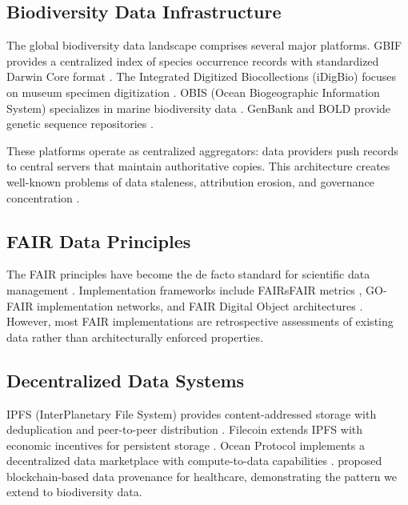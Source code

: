 \documentclass[11pt,a4paper]{article}
\begin{document}
\subsection{Biodiversity Data Infrastructure}

The global biodiversity data landscape comprises several major platforms.
GBIF provides a centralized index of species occurrence records with standardized Darwin Core format \citep{wieczorek2012darwin}.
The Integrated Digitized Biocollections (iDigBio) focuses on museum specimen digitization \citep{nelson2019digitization}.
OBIS (Ocean Biogeographic Information System) specializes in marine biodiversity data \citep{grassle2000ocean}.
GenBank and BOLD provide genetic sequence repositories \citep{benson2018genbank}.

These platforms operate as centralized aggregators: data providers push records to central servers that maintain authoritative copies.
This architecture creates well-known problems of data staleness, attribution erosion, and governance concentration \citep{arinoetal2013}.

\subsection{FAIR Data Principles}

The FAIR principles have become the de facto standard for scientific data management \citep{wilkinson2016fair}.
Implementation frameworks include FAIRsFAIR metrics \citep{devaraju2021fairsfair}, GO-FAIR implementation networks, and FAIR Digital Object architectures \citep{schultes2019fair}.
However, most FAIR implementations are retrospective assessments of existing data rather than architecturally enforced properties.

\subsection{Decentralized Data Systems}

IPFS (InterPlanetary File System) provides content-addressed storage with deduplication and peer-to-peer distribution \citep{benet2014ipfs}.
Filecoin extends IPFS with economic incentives for persistent storage \citep{protocol2017filecoin}.
Ocean Protocol implements a decentralized data marketplace with compute-to-data capabilities \citep{mcconaghy2020ocean}.
\citet{ramachandran2018trinity} proposed blockchain-based data provenance for healthcare, demonstrating the pattern we extend to biodiversity data.
\end{document}
